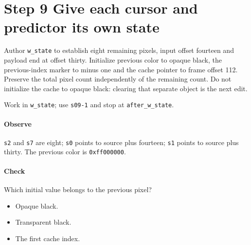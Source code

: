 \section{Step 9 Give each cursor and predictor its own state}\label{qoi-s09}
Author \texttt{w\_state} to establish eight remaining pixels, input offset fourteen and payload end at offset thirty. Initialize previous color to opaque black, the previous-index marker to minus one and the cache pointer to frame offset 112. Preserve the total pixel count independently of the remaining count. Do not initialize the cache to opaque black: clearing that separate object is the next edit.

Work in \texttt{w\_state}; use \texttt{s09-1} and stop at \texttt{after\_w\_state}.

\paragraph{Observe} \texttt{s2} and \texttt{s7} are eight; \texttt{s0} points to source plus fourteen; \texttt{s1} points to source plus thirty. The previous color is \texttt{0xff000000}.

\paragraph{Check} Which initial value belongs to the previous pixel?
\begin{itemize}
  \item[A.] Opaque black.
  \item[B.] Transparent black.
  \item[C.] The first cache index.
\end{itemize}
